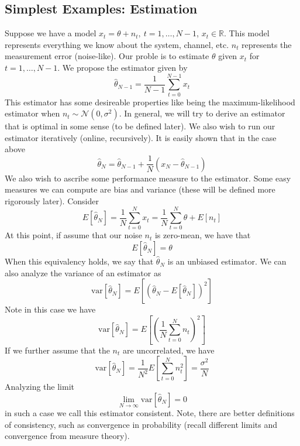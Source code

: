\documentclass[a4paper]{article}
\begin{document}
\subsection*{Simplest Examples: Estimation}%
\label{sub:Simplest Examples: Estimation}
Suppose we have a model $x_t = \theta + n_t, \ t = 1, \dots, N-1$, $x_t \in \mathds{R}$. This model represents everything we know about the system, channel, etc. $n_t$ represents the measurement error (noise-like). Our proble is to estimate $\theta$ given $x_t$ for $t = 1, \dots, N-1$. We propose the estimator given by 
\[
\hat{\theta}_{N-1} = \frac{1}{N-1} \sum^{N-1}_{t=0} x_t
\]
This estimator has some desireable properties like being the maximum-likelihood estimator when $n_t \sim \mathcal{N}(0, \sigma^2)$. In general, we will try to derive an estimator that is optimal in some sense (to be defined later). We also wish to run our estimator iteratively (online, recursively). It is easily shown that in the case above
\[
  \hat{\theta}_N = \hat{\theta}_{N-1} + \frac{1}{N}(x_N - \hat{\theta}_{N-1})
\]
We also wish to ascribe some performance measure to the estimator. Some easy measures we can compute are bias and variance (these will be defined more rigorously later). Consider 
\[
  E[\hat{\theta}_{N}] = \frac{1}{N} \sum^{N}_{t=0} x_t = \frac{1}{N} \sum^{N}_{t=0} \theta + E[n_t]
\]
At this point, if assume that our noise $n_t$ is zero-mean, we have that
\[
  E[\hat{\theta}_N] = \theta
\]
When this equivalency holds, we say that $\hat{\theta}_N$ is an unbiased estimator. We can also analyze the variance of an estimator as
\[
  \text{var}[\hat{\theta}_N] = E[(\hat{\theta}_N - E[\hat{\theta}_N])^2]
\]
Note in this case we have
\[
  \text{var}[\hat{\theta}_N] = E\left[  \left(  \frac{1}{N}\sum_{t=0}^N n_t\right)^2\right] 
\]
If we further assume that the $n_t$ are uncorrelated, we have
\[
  \text{var}[\hat{\theta}_N] = \frac{1}{N^2}E\left[\sum_{t=0}^N n_t^2\right]  = \frac{\sigma^2}{N}
\]
Analyzing the limit 
\[
  \lim_{N \to \infty} \text{var}[\hat{\theta}_N] = 0
\]
in such a case we call this estimator consistent. Note, there are better definitions of consistency, such as convergence in probability (recall different limits and convergence from measure theory).
\end{document}
